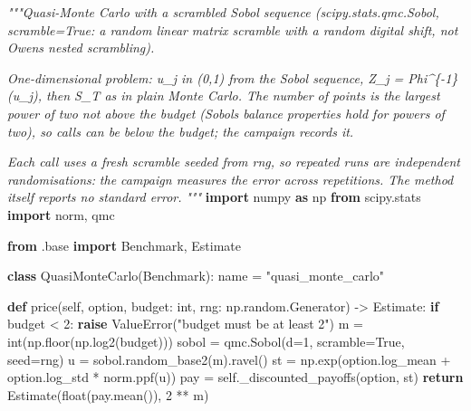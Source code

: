 \documentclass[
  10pt,
]{article}
\newenvironment{Shaded}{}{}
\newcommand{\BuiltInTok}[1]{\textcolor[rgb]{0.00,0.50,0.00}{#1}}
\newcommand{\CommentTok}[1]{\textcolor[rgb]{0.38,0.63,0.69}{\textit{#1}}}
\newcommand{\ControlFlowTok}[1]{\textcolor[rgb]{0.00,0.44,0.13}{\textbf{#1}}}
\newcommand{\DecValTok}[1]{\textcolor[rgb]{0.25,0.63,0.44}{#1}}
\newcommand{\ImportTok}[1]{\textcolor[rgb]{0.00,0.50,0.00}{\textbf{#1}}}
\newcommand{\KeywordTok}[1]{\textcolor[rgb]{0.00,0.44,0.13}{\textbf{#1}}}
\newcommand{\NormalTok}[1]{#1}
\newcommand{\OperatorTok}[1]{\textcolor[rgb]{0.40,0.40,0.40}{#1}}
\newcommand{\PreprocessorTok}[1]{\textcolor[rgb]{0.74,0.48,0.00}{#1}}
\newcommand{\StringTok}[1]{\textcolor[rgb]{0.25,0.44,0.63}{#1}}
\newcommand{\VariableTok}[1]{\textcolor[rgb]{0.10,0.09,0.49}{#1}}
\begin{document}
\begin{Shaded}
\begin{Highlighting}[]
\CommentTok{"""Quasi{-}Monte Carlo with a scrambled Sobol sequence (scipy.stats.qmc.Sobol, scramble=True: a random linear}
\CommentTok{matrix scramble with a random digital shift, not Owen\textquotesingle{}s nested scrambling).}

\CommentTok{One{-}dimensional problem: u\_j in (0,1) from the Sobol sequence, Z\_j = Phi\^{}\{{-}1\}(u\_j), then S\_T as in plain}
\CommentTok{Monte Carlo. The number of points is the largest power of two not above the budget (Sobol\textquotesingle{}s balance}
\CommentTok{properties hold for powers of two), so \textasciigrave{}calls\textasciigrave{} can be below the budget; the campaign records it.}

\CommentTok{Each call uses a fresh scramble seeded from \textasciigrave{}rng\textasciigrave{}, so repeated runs are independent randomisations:}
\CommentTok{the campaign measures the error across repetitions. The method itself reports no standard error.}
\CommentTok{"""}
\ImportTok{import}\NormalTok{ numpy }\ImportTok{as}\NormalTok{ np}
\ImportTok{from}\NormalTok{ scipy.stats }\ImportTok{import}\NormalTok{ norm, qmc}

\ImportTok{from}\NormalTok{ .base }\ImportTok{import}\NormalTok{ Benchmark, Estimate}


\KeywordTok{class}\NormalTok{ QuasiMonteCarlo(Benchmark):}
\NormalTok{    name }\OperatorTok{=} \StringTok{"quasi\_monte\_carlo"}

    \KeywordTok{def}\NormalTok{ price(}\VariableTok{self}\NormalTok{, option, budget: }\BuiltInTok{int}\NormalTok{, rng: np.random.Generator) }\OperatorTok{{-}\textgreater{}}\NormalTok{ Estimate:}
        \ControlFlowTok{if}\NormalTok{ budget }\OperatorTok{\textless{}} \DecValTok{2}\NormalTok{:}
            \ControlFlowTok{raise} \PreprocessorTok{ValueError}\NormalTok{(}\StringTok{"budget must be at least 2"}\NormalTok{)}
\NormalTok{        m }\OperatorTok{=} \BuiltInTok{int}\NormalTok{(np.floor(np.log2(budget)))}
\NormalTok{        sobol }\OperatorTok{=}\NormalTok{ qmc.Sobol(d}\OperatorTok{=}\DecValTok{1}\NormalTok{, scramble}\OperatorTok{=}\VariableTok{True}\NormalTok{, seed}\OperatorTok{=}\NormalTok{rng)}
\NormalTok{        u }\OperatorTok{=}\NormalTok{ sobol.random\_base2(m).ravel()}
\NormalTok{        st }\OperatorTok{=}\NormalTok{ np.exp(option.log\_mean }\OperatorTok{+}\NormalTok{ option.log\_std }\OperatorTok{*}\NormalTok{ norm.ppf(u))}
\NormalTok{        pay }\OperatorTok{=} \VariableTok{self}\NormalTok{.\_discounted\_payoffs(option, st)}
        \ControlFlowTok{return}\NormalTok{ Estimate(}\BuiltInTok{float}\NormalTok{(pay.mean()), }\DecValTok{2} \OperatorTok{**}\NormalTok{ m)}
\end{Highlighting}
\end{Shaded}
\end{document}
